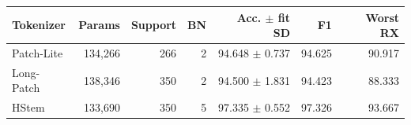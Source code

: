 \begin{tabular}{lrrrrrr}
\toprule Tokenizer & Params & Support & BN & Acc. $\pm$ fit SD & F1 & Worst RX\\
\midrule
Patch-Lite & 134,266 & 266 & 2 & 94.648 $\pm$ 0.737 & 94.625 & 90.917\\
Long-Patch & 138,346 & 350 & 2 & 94.500 $\pm$ 1.831 & 94.423 & 88.333\\
HStem & 133,690 & 350 & 5 & 97.335 $\pm$ 0.552 & 97.326 & 93.667\\
\bottomrule
\end{tabular}
